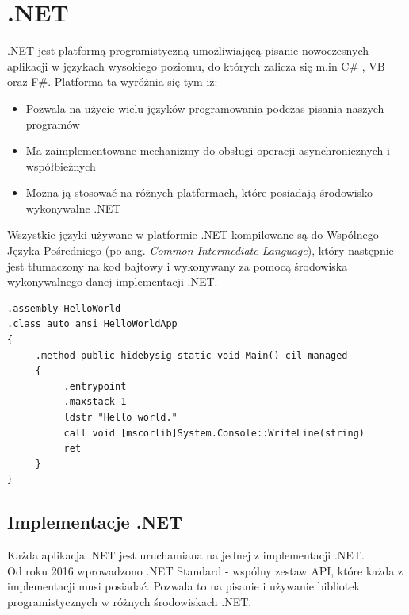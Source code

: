 


{\let\cleardoublepage\relax \chapter{.NET}}
\label{cha:wstep}

.NET jest platformą programistyczną umożliwiającą pisanie nowoczesnych aplikacji w językach wysokiego poziomu, do których zalicza się m.in C\# , VB oraz F\#. Platforma ta wyróżnia się tym iż:
\begin{itemize}
	\item Pozwala na użycie wielu języków programowania podczas pisania naszych programów
	\item Ma zaimplementowane mechanizmy do obsługi operacji asynchronicznych i współbieżnych
	\item Można ją stosować na różnych platformach, które posiadają środowisko wykonywalne .NET
\end{itemize}
Wszystkie języki używane w platformie .NET kompilowane są do Wspólnego Języka Pośredniego (po ang. \textit{Common Intermediate Language}), który następnie jest tłumaczony na kod bajtowy i wykonywany za pomocą środowiska wykonywalnego danej implementacji .NET.

\begin{lstlisting}[frame=single, numbers=none,captionpos=b, 
caption={Przykładowy kod aplikacji "Hello World" w języku CIL}]
.assembly HelloWorld
.class auto ansi HelloWorldApp
{
     .method public hidebysig static void Main() cil managed
     {
          .entrypoint
          .maxstack 1
          ldstr "Hello world."
          call void [mscorlib]System.Console::WriteLine(string)
          ret
     }
}
\end{lstlisting}


\section{Implementacje .NET}

Każda aplikacja .NET jest uruchamiana na jednej z implementacji .NET. \\
Od roku 2016 wprowadzono .NET Standard - wspólny zestaw API, które każda z implementacji musi posiadać. Pozwala to na pisanie i używanie bibliotek programistycznych w różnych środowiskach .NET.

